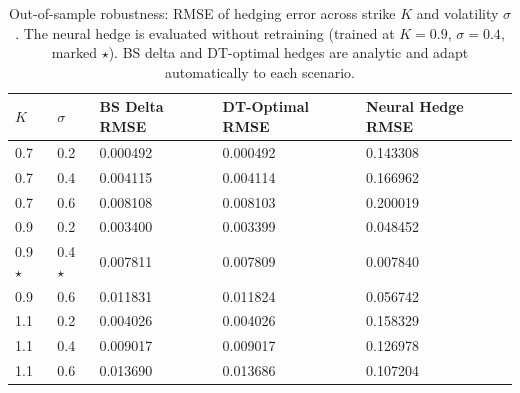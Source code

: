 \begin{table}
\caption{Out-of-sample robustness: RMSE of hedging error across strike $K$ and volatility $\sigma$. The neural hedge is evaluated without retraining (trained at $K=0.9$, $\sigma=0.4$, marked $\star$). BS delta and DT-optimal hedges are analytic and adapt automatically to each scenario.}
\label{tab:robustness}
\begin{tabular}{lllll}
\toprule
$K$ & $\sigma$ & BS Delta RMSE & DT-Optimal RMSE & Neural Hedge RMSE \\
\midrule
0.7 & 0.2 & 0.000492 & 0.000492 & 0.143308 \\
0.7 & 0.4 & 0.004115 & 0.004114 & 0.166962 \\
0.7 & 0.6 & 0.008108 & 0.008103 & 0.200019 \\
0.9 & 0.2 & 0.003400 & 0.003399 & 0.048452 \\
0.9 $\star$ & 0.4 $\star$ & 0.007811 & 0.007809 & 0.007840 \\
0.9 & 0.6 & 0.011831 & 0.011824 & 0.056742 \\
1.1 & 0.2 & 0.004026 & 0.004026 & 0.158329 \\
1.1 & 0.4 & 0.009017 & 0.009017 & 0.126978 \\
1.1 & 0.6 & 0.013690 & 0.013686 & 0.107204 \\
\bottomrule
\end{tabular}
\end{table}
